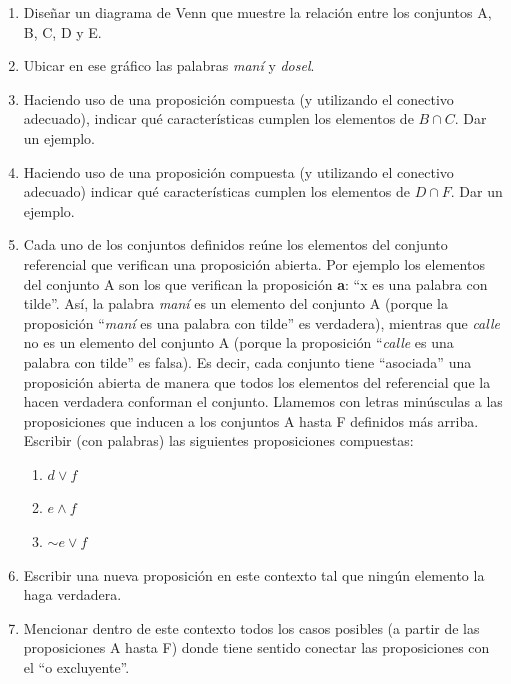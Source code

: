 \documentclass[12pt]{article}
\theoremstyle{definition}
\theoremstyle{remark}
\begin{document}
\begin{enumerate}
\begin{enumerate}
\item Diseñar un diagrama de Venn que muestre la relación entre los conjuntos A, B, C, D y E.

\item Ubicar en ese gráfico las palabras \textit{maní} y \textit{dosel}.

\item Haciendo uso de una proposición compuesta (y utilizando el conectivo adecuado), indicar qué características cumplen los elementos de $B \cap C$. Dar un ejemplo.

\item  Haciendo uso de una proposición compuesta (y utilizando el conectivo adecuado) indicar qué características cumplen los elementos de $D \cap F$. Dar un ejemplo.

\item Cada uno de los conjuntos definidos reúne los elementos del conjunto referencial que verifican una proposición abierta. Por ejemplo los elementos del conjunto A son los que verifican la proposición \textbf{a}: “x es una palabra con tilde”. Así, la palabra \textit{maní} es un elemento del conjunto A (porque la proposición “\textit{maní} es una palabra con tilde” es verdadera), mientras que \textit{calle} no es un elemento del conjunto A (porque la proposición “\textit{calle} es una palabra con tilde” es falsa). Es decir, cada conjunto tiene “asociada” una proposición abierta de manera que todos los elementos del referencial que la hacen verdadera conforman el conjunto. Llamemos con letras minúsculas a las proposiciones que inducen a los conjuntos A hasta F definidos más arriba. Escribir (con palabras) las siguientes proposiciones compuestas:\\
\begin{multicols}{3}
 \begin{enumerate}
\item $d \vee f$ 
\item $e\wedge f$		
\item $\sim e\vee f$
\end{enumerate}
\end{multicols}

\item Escribir una nueva proposición en este contexto tal que ningún elemento la haga verdadera.

\item Mencionar dentro de este contexto todos los casos posibles (a partir de las proposiciones A hasta F) donde tiene sentido conectar las proposiciones con el “o excluyente”.


\end{enumerate}
\end{enumerate}
\end{document}
